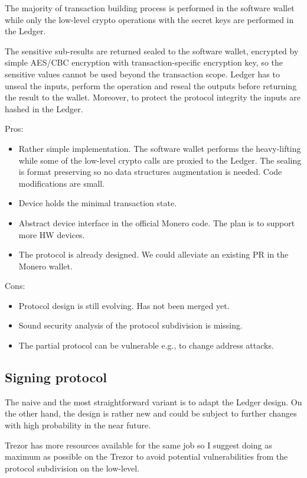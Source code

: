 \documentclass[]{article}
\begin{document}
The majority of transaction building process is performed in the software wallet while only the low-level crypto operations with the secret keys are performed in the Ledger.  

The sensitive sub-results are returned sealed to the software wallet, encrypted by simple AES/CBC encryption with transaction-specific encryption key, so the sensitive values cannot be used beyond the transaction scope. Ledger has to unseal the inputs, perform the operation and reseal the outputs before returning the result to the wallet. Moreover, to protect the protocol integrity the inputs are hashed in the Ledger. 

\;
\noindent Pros:
\begin{itemize}
	\item Rather simple implementation. The software wallet performs the heavy-lifting while some of the 
	low-level crypto calls are proxied to the Ledger. The sealing is format preserving so no data structures augmentation is needed. Code modifications are small.
	\item Device holds the minimal transaction state.
	\item Abstract device interface in the official Monero code. The plan is to support more HW devices.
	\item The protocol is already designed. We could alleviate an existing PR\cite{ledger_pr} in the Monero wallet.
\end{itemize}

\noindent Cons:
\begin{itemize}
	\item Protocol design is still evolving. Has not been merged yet.
	\item Sound security analysis of the protocol subdivision is missing. 
	\item The partial protocol can be vulnerable e.g., to change address attacks.
\end{itemize}

\subsection{Signing protocol}

The naive and the most straightforward variant is to adapt the Ledger design. On the other hand, the design is rather new and could be subject to further changes with high probability in the near future. 

Trezor has more resources available for the same job so I suggest doing as maximum as possible on the Trezor to avoid potential vulnerabilities from the protocol subdivision on the low-level.
\end{document}
